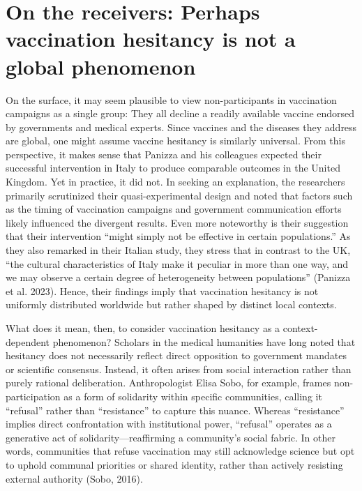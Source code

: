 \documentclass[authordate, reflection]{jote-new-article}
\begin{document}
	\section{On the receivers: Perhaps vaccination hesitancy is not a global phenomenon}



	On the surface, it may seem plausible to view non-participants in vaccination campaigns as a single group: They all decline a readily available vaccine endorsed by governments and medical experts. Since vaccines and the diseases they address are global, one might assume vaccine hesitancy is similarly universal. From this perspective, it makes sense that Panizza and his colleagues expected their successful intervention in Italy to produce comparable outcomes in the United Kingdom. Yet in practice, it did not. In seeking an explanation, the researchers primarily scrutinized their quasi-experimental design and noted that factors such as the timing of vaccination campaigns and government communication efforts likely influenced the divergent results. Even more noteworthy is their suggestion that their intervention “might simply not be effective in certain populations.” As they also remarked in their Italian study, they stress that in contrast to the UK, “the cultural characteristics of Italy make it peculiar in more than one way, and we may observe a certain degree of heterogeneity between populations” (Panizza et al. 2023). Hence, their findings imply that vaccination hesitancy is not uniformly distributed worldwide but rather shaped by distinct local contexts.







	What does it mean, then, to consider vaccination hesitancy as a context-dependent phenomenon? Scholars in the medical humanities have long noted that hesitancy does not necessarily reflect direct opposition to government mandates or scientific consensus. Instead, it often arises from social interaction rather than purely rational deliberation. Anthropologist Elisa Sobo, for example, frames non-participation as a form of solidarity within specific communities, calling it “refusal” rather than “resistance” to capture this nuance. Whereas “resistance” implies direct confrontation with institutional power, “refusal” operates as a generative act of solidarity—reaffirming a community's social fabric. In other words, communities that refuse vaccination may still acknowledge science but opt to uphold communal priorities or shared identity, rather than actively resisting external authority (Sobo, 2016).
\end{document}
